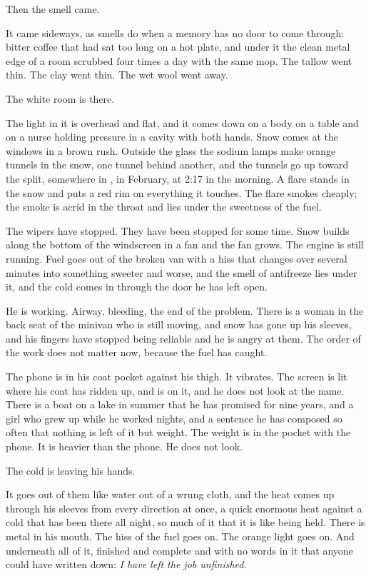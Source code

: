 Then the smell came.

It came sideways, as smells do when a memory has no door to come through: bitter coffee that had sat too long on a hot plate, and under it the clean metal edge of a room scrubbed four times a day with the same mop. The tallow went thin. The clay went thin. The wet wool went away.

The white room is there.

The light in it is overhead and flat, and it comes down on a body on a table and on a nurse holding pressure in a cavity with both hands. Snow comes at the windows in a brown rush. Outside the glass the sodium lamps make orange tunnels in the snow, one tunnel behind another, and the tunnels go up  toward the split, somewhere in , in February, at 2:17 in the morning. A flare stands in the snow and puts a red rim on everything it touches. The flare smokes cheaply; the smoke is acrid in the throat and lies under the sweetness of the fuel.

The wipers have stopped. They have been stopped for some time. Snow builds along the bottom of the windscreen in a fan and the fan grows. The engine is still running. Fuel goes out of the broken van with a hiss that changes over several minutes into something sweeter and worse, and the smell of antifreeze lies under it, and the cold comes in through the door he has left open.

He is working. Airway, bleeding, the end of the problem. There is a woman in the back seat of the minivan who is still moving, and snow has gone up his sleeves, and his fingers have stopped being reliable and he is angry at them. The order of the work does not matter now, because the fuel has caught.

The phone is in his coat pocket against his thigh. It vibrates. The screen is lit where his coat has ridden up, and  is on it, and he does not look at the name. There is a boat on a lake in summer that he has promised for nine years, and a girl who grew up while he worked nights, and a sentence he has composed so often that nothing is left of it but weight. The weight is in the pocket with the phone. It is heavier than the phone. He does not look.

The cold is leaving his hands.

It goes out of them like water out of a wrung cloth, and the heat comes up through his sleeves from every direction at once, a quick enormous heat against a cold that has been there all night, so much of it that it is like being held. There is metal in his mouth. The hiss of the fuel goes on. The orange light goes on. And underneath all of it, finished and complete and with no words in it that anyone could have written down: \emph{I have left the job unfinished.}


